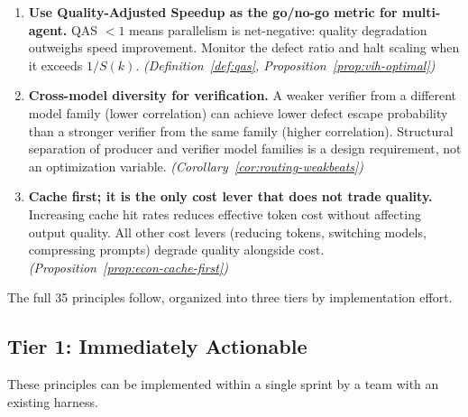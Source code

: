 \documentclass[11pt, a4paper]{googledeepmind}
\begin{document}
\begin{enumerate}[label=\textbf{\arabic*.}, nosep]
    \item \textbf{Use Quality-Adjusted Speedup as the go/no-go metric for multi-agent.} QAS $< 1$ means parallelism is net-negative: quality degradation outweighs speed improvement. Monitor the defect ratio and halt scaling when it exceeds $1/S(k)$. \emph{(Definition~\ref{def:qas}, Proposition~\ref{prop:vih-optimal})}

    \item \textbf{Cross-model diversity for verification.} A weaker verifier from a different model family (lower correlation) can achieve lower defect escape probability than a stronger verifier from the same family (higher correlation). Structural separation of producer and verifier model families is a design requirement, not an optimization variable. \emph{(Corollary~\ref{cor:routing-weakbeats})}

    \item \textbf{Cache first; it is the only cost lever that does not trade quality.} Increasing cache hit rates reduces effective token cost without affecting output quality. All other cost levers (reducing tokens, switching models, compressing prompts) degrade quality alongside cost. \emph{(Proposition~\ref{prop:econ-cache-first})}
\end{enumerate}

\noindent The full 35 principles follow, organized into three tiers by implementation effort.

\subsection{Tier 1: Immediately Actionable}
\label{sec:tier1}

These principles can be implemented within a single sprint by a team with an existing harness.
\end{document}
